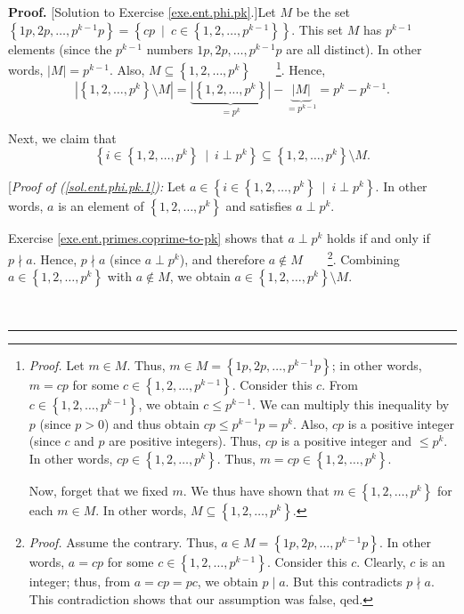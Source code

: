 \documentclass[numbers=enddot,12pt,final,onecolumn,notitlepage]{scrartcl}%
\numberwithin{exer}{subsection}
\theoremstyle{definition}
\newenvironment{fineprint}{\begin{small}}{\end{small}}
\newenvironment{proof}[1][Proof]{\noindent\textbf{#1.} }{\ \rule{0.5em}{0.5em}}
\begin{document}
\begin{fineprint}
\begin{proof}
[Solution to Exercise \ref{exe.ent.phi.pk}.]Let $M$ be the set $\left\{
1p,2p,\ldots,p^{k-1}p\right\}  =\left\{  cp\ \mid\ c\in\left\{  1,2,\ldots
,p^{k-1}\right\}  \right\}  $. This set $M$ has $p^{k-1}$ elements (since the
$p^{k-1}$ numbers $1p,2p,\ldots,p^{k-1}p$ are all distinct). In other words,
$\left\vert M\right\vert =p^{k-1}$. Also, $M\subseteq\left\{  1,2,\ldots
,p^{k}\right\}  $\ \ \ \ \footnote{\textit{Proof.} Let $m\in M$. Thus, $m\in
M=\left\{  1p,2p,\ldots,p^{k-1}p\right\}  $; in other words, $m=cp$ for some
$c\in\left\{  1,2,\ldots,p^{k-1}\right\}  $. Consider this $c$. From
$c\in\left\{  1,2,\ldots,p^{k-1}\right\}  $, we obtain $c\leq p^{k-1}$. We can
multiply this inequality by $p$ (since $p>0$) and thus obtain $cp\leq
p^{k-1}p=p^{k}$. Also, $cp$ is a positive integer (since $c$ and $p$ are
positive integers). Thus, $cp$ is a positive integer and $\leq p^{k}$. In
other words, $cp\in\left\{  1,2,\ldots,p^{k}\right\}  $. Thus, $m=cp\in
\left\{  1,2,\ldots,p^{k}\right\}  $.
\par
Now, forget that we fixed $m$. We thus have shown that $m\in\left\{
1,2,\ldots,p^{k}\right\}  $ for each $m\in M$. In other words, $M\subseteq
\left\{  1,2,\ldots,p^{k}\right\}  $.}. Hence,%
\begin{equation}
\left\vert \left\{  1,2,\ldots,p^{k}\right\}  \setminus M\right\vert
=\underbrace{\left\vert \left\{  1,2,\ldots,p^{k}\right\}  \right\vert
}_{=p^{k}}-\underbrace{\left\vert M\right\vert }_{=p^{k-1}}=p^{k}-p^{k-1}.
\label{sol.ent.phi.pk.0}%
\end{equation}


Next, we claim that%
\begin{equation}
\left\{  i\in\left\{  1,2,\ldots,p^{k}\right\}  \ \mid\ i\perp p^{k}\right\}
\subseteq\left\{  1,2,\ldots,p^{k}\right\}  \setminus M.
\label{sol.ent.phi.pk.1}%
\end{equation}


[\textit{Proof of (\ref{sol.ent.phi.pk.1}):} Let $a\in\left\{  i\in\left\{
1,2,\ldots,p^{k}\right\}  \ \mid\ i\perp p^{k}\right\}  $. In other words, $a$
is an element of $\left\{  1,2,\ldots,p^{k}\right\}  $ and satisfies $a\perp
p^{k}$.

Exercise \ref{exe.ent.primes.coprime-to-pk} shows that $a\perp p^{k}$ holds if
and only if $p\nmid a$. Hence, $p\nmid a$ (since $a\perp p^{k}$), and
therefore $a\notin M$\ \ \ \ \footnote{\textit{Proof.} Assume the contrary.
Thus, $a\in M=\left\{  1p,2p,\ldots,p^{k-1}p\right\}  $. In other words,
$a=cp$ for some $c\in\left\{  1,2,\ldots,p^{k-1}\right\}  $. Consider this
$c$. Clearly, $c$ is an integer; thus, from $a=cp=pc$, we obtain $p\mid a$.
But this contradicts $p\nmid a$. This contradiction shows that our assumption
was false, qed.}. Combining $a\in\left\{  1,2,\ldots,p^{k}\right\}  $ with
$a\notin M$, we obtain $a\in\left\{  1,2,\ldots,p^{k}\right\}  \setminus M$.


\end{proof}
\end{fineprint}
\end{document}
